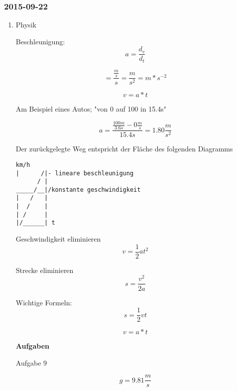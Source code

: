 \documentclass[11pt]{article}
\begin{document}
\subsubsection{2015-09-22}
\label{sec-1-2-6}
\begin{enumerate}
\item Physik
\label{sec-1-2-6-1}

Beschleunigung:
\begin{equation}
a = \frac{d_v}{d_t}
\end{equation}

\begin{equation}
[a] = \frac{\frac{m}{s}}{s} = \frac{m}{s^2} = m * s^{-2}
\end{equation}

\begin{equation}
v = a * t
\end{equation}

Am Beispiel eines Autos; "von 0 auf 100 in 15.4s"

\begin{equation}
a = \frac{\frac{100m}{3.6s} - 0\frac{m}{s}}{15.4s} = 1.80 \frac{m}{s^2}
\end{equation}

Der zurückgelegte Weg entspricht der Fläche des folgenden Diagramms

\begin{verbatim}
km/h
|      /|- lineare beschleunigung
      / |
_____/__|/konstante geschwindigkeit
|   /   |
|  /    |
| /     |
|/______| t
\end{verbatim}

Geschwindigkeit eliminieren
\begin{equation}
v = \frac{1}{2} at^2
\end{equation}

Strecke eliminieren
\begin{equation}
s = \frac{v^2}{2a}
\end{equation}

Wichtige Formeln:
\begin{equation}
s = \frac{1}{2}vt
\end{equation}

\begin{equation}
v = a * t
\end{equation}


\textbf{Aufgaben}

Aufgabe 9


\begin{equation}
g = 9.81\frac{m}{s}
\end{equation}



\end{enumerate}
\end{document}
